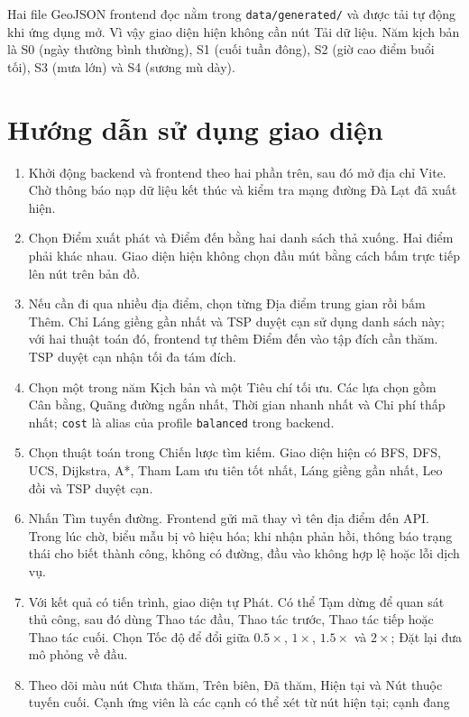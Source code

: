 Hai file GeoJSON frontend đọc nằm trong
\texttt{data/generated/} và được tải tự động khi ứng dụng
mở. Vì vậy giao diện hiện không cần nút Tải dữ liệu. Năm kịch bản là S0
(ngày thường bình thường), S1 (cuối tuần đông), S2 (giờ cao điểm buổi tối), S3
(mưa lớn) và S4 (sương mù dày).

\section{Hướng dẫn sử dụng giao diện}

\begin{enumerate}[itemsep=3pt]
  \item Khởi động backend và frontend theo hai phần trên, sau đó mở địa chỉ Vite.
  Chờ thông báo nạp dữ liệu kết thúc và kiểm tra mạng đường Đà Lạt đã xuất hiện.
  \item Chọn Điểm xuất phát và Điểm đến bằng hai danh sách thả xuống. Hai
  điểm phải khác nhau. Giao diện hiện không chọn đầu mút bằng cách bấm trực tiếp
  lên nút trên bản đồ.
  \item Nếu cần đi qua nhiều địa điểm, chọn từng Địa điểm trung gian rồi bấm
  Thêm. Chỉ Láng giềng gần nhất và TSP duyệt cạn sử dụng danh sách này; với hai
  thuật toán đó, frontend tự thêm Điểm đến vào tập đích cần thăm. TSP duyệt cạn
  nhận tối đa tám đích.
  \item Chọn một trong năm Kịch bản và một Tiêu chí tối ưu. Các lựa chọn gồm
  Cân bằng, Quãng đường ngắn nhất, Thời gian nhanh nhất và Chi phí thấp nhất; \texttt{cost}
  là alias của profile \texttt{balanced} trong backend.
  \item Chọn thuật toán trong Chiến lược tìm kiếm. Giao diện hiện có BFS, DFS,
  UCS, Dijkstra, A*, Tham Lam ưu tiên tốt nhất, Láng giềng gần nhất, Leo đồi
  và TSP duyệt cạn.
  \item Nhấn Tìm tuyến đường. Frontend gửi mã thay vì tên địa điểm đến API. Trong lúc
  chờ, biểu mẫu bị vô hiệu hóa; khi nhận phản hồi, thông báo trạng thái cho biết
  thành công, không có đường, đầu vào không hợp lệ hoặc lỗi dịch vụ.
  \item Với kết quả có tiến trình, giao diện tự Phát. Có thể Tạm dừng để quan sát thủ
  công, sau đó dùng Thao tác đầu, Thao tác trước, Thao tác tiếp hoặc Thao tác cuối.
  Chọn Tốc độ để đổi giữa $0.5\times$, $1\times$, $1.5\times$ và
  $2\times$; Đặt lại đưa mô phỏng về đầu.
  \item Theo dõi màu nút Chưa thăm, Trên biên, Đã thăm, Hiện tại và Nút thuộc
  tuyến cuối. Cạnh ứng viên là các cạnh có thể xét từ nút hiện tại; cạnh đang

\end{enumerate}
